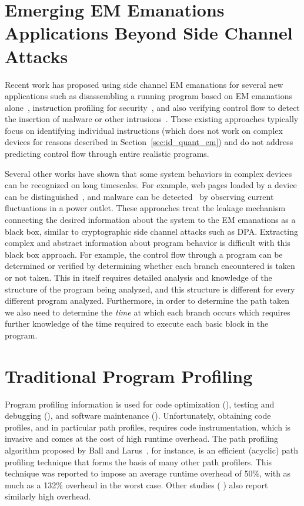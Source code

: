 \section{Emerging EM Emanations Applications Beyond Side Channel Attacks}

Recent work has proposed using side channel EM emanations for several new applications such as disassembling a running program based on EM emanations alone~\cite{eisenbarth2010, scandalee}, instruction profiling for security~\cite{msgna2014}, and also verifying control flow to detect the insertion of malware or other intrusions~\cite{msgna2014_verifying,becker2012,msgna2013}. These existing approaches typically focus on identifying individual instructions (which does not work on complex devices for reasons described in Section~\ref{sec:id_quant_em}) and do not address predicting control flow through entire realistic programs. 

Several other works have shown that some system behaviors in complex devices can be recognized on long timescales. For example, web pages loaded by a device can be distinguished~\cite{Crampton2013}, and malware can be detected~\cite{clark2013} by observing current fluctuations in a power outlet. These approaches treat the leakage mechanism connecting the desired information about the system to the EM emanations as a black box, similar to cryptographic side channel attacks such as DPA. Extracting complex and abstract information about program behavior is difficult with this black box approach. For example, the control flow through a program can be determined or verified by determining whether each branch encountered is taken or not taken. This in itself requires detailed analysis and knowledge of the structure of the program being analyzed, and this structure is different for every different program analyzed. Furthermore, in order to determine the path taken we also need to determine the \textit{time} at which each branch occurs which requires further knowledge of the time required to execute each basic block in the program. 

\section{Traditional Program Profiling}

Program profiling information is used for code optimization (\eg \cite{Debray:2002:PCC:512529.512542}), testing and debugging (\eg \cite{Chilimbi:2009:HES:1555001.1555020}), and software maintenance (\eg \cite{Ernst:1999:DDL:302405.302467}). Unfortunately, obtaining code profiles, and in particular path profiles, requires code instrumentation, which is invasive and comes at the cost of high runtime overhead. The path profiling algorithm proposed by Ball and Larus~\cite{Ball:1996:EPP:243846.243857}, for instance, is an efficient (acyclic) path profiling technique that forms the basis of many other path profilers. This technique was reported to impose an average runtime overhead of 50\%, with as much as a 132\% overhead in the worst case.  Other studies (\eg
\cite{Bond:2005:PPP:1048922.1048988,Vaswani:2007:PPP:1190216.1190268}) also report similarly high overhead.

